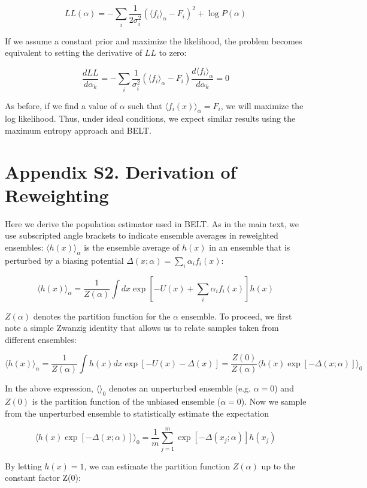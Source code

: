 \documentclass[journal=jacsat,manuscript=article]{achemso}
\begin{document}
$$LL(\alpha) = -\sum_i \frac{1}{2\sigma_i^2}(\langle f_i\rangle _\alpha - F_i)^2 + \log P(\alpha)$$

If we assume a constant prior and maximize the likelihood, the problem becomes equivalent to setting the derivative of $LL$ to zero:

$$ \frac{dLL}{d\alpha_k} =  -\sum_i \frac{1}{\sigma_i^2} (\langle f_i\rangle _\alpha - F_i) \frac{d\langle f_i\rangle _\alpha}{d\alpha_k} = 0$$

As before, if we find a value of $\alpha$ such that $\langle f_i(x) \rangle_\alpha = F_i$, we will maximize the log likelihood.  Thus, under ideal conditions, we expect similar results using the maximum entropy approach and BELT.  


\newpage

\section{Appendix S2.  Derivation of Reweighting}

Here we derive the population estimator used in BELT.  As in the main text, we use subscripted angle brackets to indicate ensemble averages in reweighted ensembles: $\langle h(x)\rangle _\alpha$ is the ensemble average of $h(x)$ in an ensemble that is perturbed by a biasing potential $\Delta (x;\alpha) = \sum_i \alpha_i f_i(x)$:

$$\langle h(x)\rangle _\alpha = \frac{1}{Z(\alpha)} \int dx \exp[-U(x) + \sum_i \alpha_i f_i(x)] h(x)$$

$Z(\alpha)$ denotes the partition function for the $\alpha$ ensemble.  To proceed, we first note a simple Zwanzig identity that allows us to relate samples taken from different ensembles:

$$\langle h(x)\rangle _\alpha = \frac{1}{Z(\alpha)} \int h(x) dx \exp[ -U(x) - \Delta(x)] = \frac{Z(0)}{Z(\alpha)} \langle h(x) \exp[-\Delta(x;\alpha)]\rangle _0 $$

In the above expression, $\langle \rangle_0$ denotes an unperturbed ensemble (e.g. $\alpha = 0$) and $Z(0)$ is the partition function of the unbiased ensemble ($\alpha = 0$).  Now we sample from the unperturbed ensemble to statistically estimate the expectation

$$\langle h(x) \exp[-\Delta(x;\alpha)]\rangle _0 = \frac{1}{m} \sum_{j = 1}^{m} \exp [ - \Delta(x_j;\alpha)] h(x_j)$$

By letting $h(x) = 1$, we can estimate the partition function $Z(\alpha)$ up to the constant factor Z(0):
\end{document}
